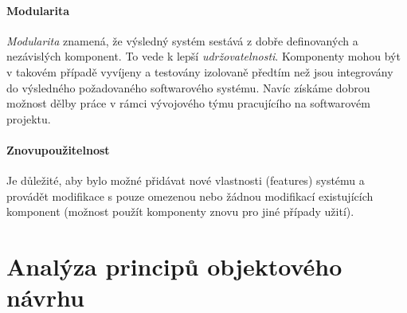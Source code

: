 \paragraph{Modularita} \emph{Modularita} znamená, že výsledný systém sestává z dobře definovaných a nezávislých komponent. To vede k lepší \emph{udržovatelnosti}. Komponenty mohou být v takovém případě vyvíjeny a testovány izolovaně předtím než jsou integrovány do výsledného požadovaného softwarového systému. Navíc získáme dobrou možnost dělby práce v rámci vývojového týmu pracujícího na softwarovém projektu.

\paragraph{Znovupoužitelnost} Je důležité, aby bylo možné přidávat nové vlastnosti (features) systému a provádět modifikace s pouze omezenou nebo žádnou modifikací existujících komponent (možnost použít komponenty znovu pro jiné případy užití).

\section{Analýza principů objektového návrhu}





